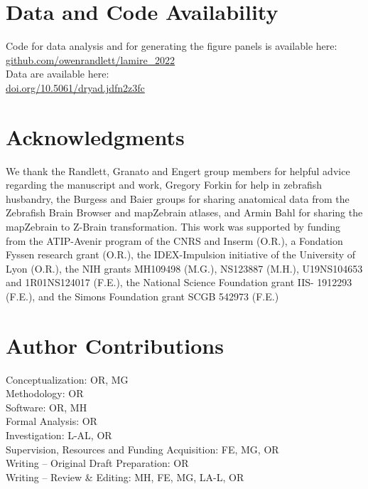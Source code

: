 \documentclass[9pt,lineno]{RandlettLab_elife}
\begin{document}
\section{Data and Code Availability}

Code for data analysis and for generating the figure panels is available here: \\
\href{https://github.com/owenrandlett/lamire_2022}{github.com/owenrandlett/lamire\_2022} \\
Data are available here: \\
\href{https://doi.org/10.5061/dryad.jdfn2z3fc}{doi.org/10.5061/dryad.jdfn2z3fc} 

\section{Acknowledgments}

We thank the Randlett, Granato and Engert group members for helpful advice regarding the manuscript and work, Gregory Forkin for help in zebrafish husbandry, the Burgess and Baier groups for sharing anatomical data from the Zebrafish Brain Browser and mapZebrain atlases, and Armin Bahl for sharing the mapZebrain to Z-Brain transformation. This work was supported by funding from the ATIP-Avenir program of the CNRS and Inserm (O.R.), a Fondation Fyssen research grant (O.R.), the IDEX-Impulsion initiative of the University of Lyon (O.R.), the NIH grants MH109498 (M.G.), NS123887 (M.H.), U19NS104653 and 1R01NS124017 (F.E.), the National Science Foundation grant IIS- 1912293 (F.E.), and the Simons Foundation grant SCGB 542973 (F.E.)


\section{Author Contributions}

Conceptualization: OR, MG \\
Methodology: OR \\
Software: OR, MH \\
Formal Analysis: OR \\ 
Investigation: L-AL, OR \\
Supervision, Resources and Funding Acquisition: FE, MG, OR \\
Writing – Original Draft Preparation: OR \\
Writing – Review \& Editing: MH, FE, MG, LA-L, OR \\


\end{document}
